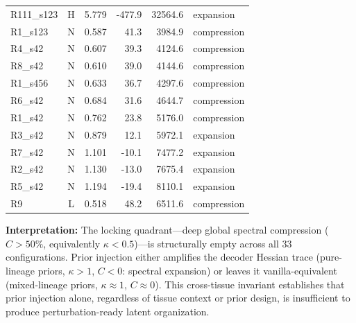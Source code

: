 \documentclass[11pt,a4paper]{article}
\begin{document}
\begin{tabular}{lcrrrl}
R111\_s123        & H &    5.779 &   -477.9 &    32564.6 & expansion \\
R1\_s123          & N &    0.587 &   41.3 &     3984.9 & compression \\
R4\_s42           & N &    0.607 &   39.3 &     4124.6 & compression \\
R8\_s42           & N &    0.610 &   39.0 &     4144.6 & compression \\
R1\_s456          & N &    0.633 &   36.7 &     4297.6 & compression \\
R6\_s42           & N &    0.684 &   31.6 &     4644.7 & compression \\
R1\_s42           & N &    0.762 &   23.8 &     5176.0 & compression \\
R3\_s42           & N &    0.879 &   12.1 &     5972.1 & expansion \\
R7\_s42           & N &    1.101 &  -10.1 &     7477.2 & expansion \\
R2\_s42           & N &    1.130 &  -13.0 &     7675.4 & expansion \\
R5\_s42           & N &    1.194 &  -19.4 &     8110.1 & expansion \\
R9                & L &    0.518 &     48.2 &     6511.6 & compression \\
\bottomrule
\end{tabular}

\vspace{0.5cm}


\vspace{0.5cm}
\textbf{Interpretation:} The locking quadrant---deep global spectral compression ($C>50\%$, equivalently $\kappa<0.5$)---is structurally empty across all 33 configurations. Prior injection either amplifies the decoder Hessian trace (pure-lineage priors, $\kappa>1$, $C<0$: spectral expansion) or leaves it vanilla-equivalent (mixed-lineage priors, $\kappa\approx1$, $C\approx0$). This cross-tissue invariant establishes that prior injection alone, regardless of tissue context or prior design, is insufficient to produce perturbation-ready latent organization.
\end{document}
